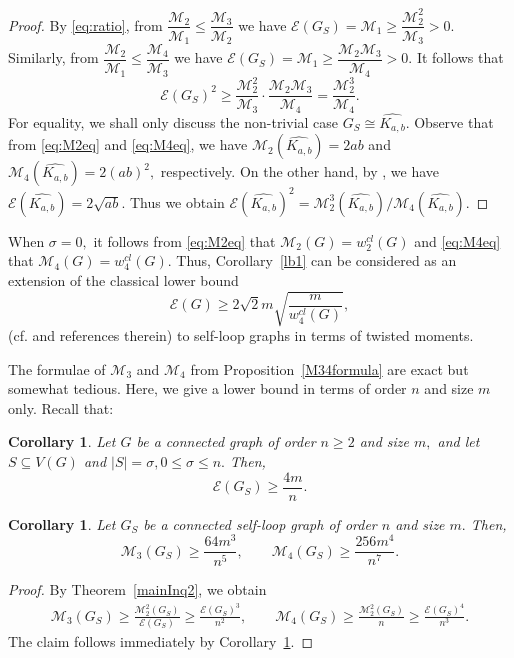 \documentclass[12pt,a4paper,reqno]{amsart}
\numberwithin{equation}{section}
\theoremstyle{plain}
\newtheorem{corollary}[theorem]{Corollary}
\theoremstyle{definition}
\newcommand{\<}{\langle}
\renewcommand{\>}{\rangle}
\newcommand{\cE}{{\mathcal E}}
\newcommand{\cM}{{\mathcal M}}
\begin{document}
\begin{proof}
By \eqref{eq:ratio}, from $\dfrac{\cM_2}{\cM_1} \leq \dfrac{\cM_3}{\cM_2}$ we have 
$
\cE(G_S)=\cM_1 \geq \dfrac{\cM_2^2}{\cM_3} > 0.
$
Similarly, from $\dfrac{\cM_2}{\cM_1} \leq \dfrac{\cM_4}{\cM_3}$ we have 
$
\cE(G_S)=\cM_1 \geq \dfrac{\cM_2\cM_3}{\cM_4} > 0.
$ 
It follows that 
\[
\cE(G_S)^2 \geq \dfrac{\cM_2^2}{\cM_3} \cdot \dfrac{\cM_2\cM_3}{\cM_4} = \dfrac{\cM_2^3}{\cM_4}. %
\]
For equality, we shall only discuss the non-trivial case $G_S \cong \widehat{K_{a,b}}.$  Observe that from \eqref{eq:M2eq} and \eqref{eq:M4eq}, we have $\cM_2(\widehat{K_{a,b}})=2ab$ and $\cM_4(\widehat{K_{a,b}})= 2(ab)^2,$ respectively. On the other hand, by \cite[Theorem 2.4, Case 5]{akbari2023selfloop}, we have $\cE(\widehat{K_{a,b}})=2\sqrt{ab}.$ Thus we obtain $\cE(\widehat{K_{a,b}})^2= \cM^3_2(\widehat{K_{a,b}})/\cM_4(\widehat{K_{a,b}}).$ 
\end{proof}

When $\sigma=0,$ it follows from \eqref{eq:M2eq} that $\cM_2(G)=w^{cl}_2(G)$ and \eqref{eq:M4eq} that $\cM_4(G)= w^{cl}_4(G).$ Thus, Corollary~\ref{lb1} can be considered as an extension of the classical lower bound 
\[
\cE(G) \geq 2\sqrt{2}m\sqrt{\frac{m}{w^{cl}_4(G)}},
\] (cf. \cite[\S 4, eq (11)]{MajKloGut2009} and references therein) to self-loop graphs in terms of twisted moments.

The formulae of $\cM_3$ and $\cM_4$ from Proposition~\ref{M34formula} are exact but somewhat tedious. Here, we give a lower bound in terms of order $n$ and size $m$ only. Recall that:

\begin{corollary}\cite[Corollary 3.6]{akbari2024line} \label{Cor3.8}
  Let $G$ be a connected graph of order $n \geq 2$ and size $m,$ and let $S \subseteq V(G)$ and $|S|=\sigma, 0 \leq \sigma \leq n.$ Then,
  \[
    \cE(G_S) \geq \frac{4m}{n}.
  \]
\end{corollary}

\begin{corollary}
\label{lb2}
Let $G_S$ be a connected self-loop graph of order $n$ and size $m.$ Then,
\begin{equation}
\label{eq:lb2}
\cM_3(G_S) \geq \frac{64m^3}{n^5}, \qquad
\cM_4(G_S) \geq \frac{256m^4}{n^7}.
\end{equation}
\end{corollary}

\begin{proof}
By Theorem~\ref{mainInq2}, we obtain 
\begin{align*}
\cM_3(G_S) \geq \frac{\cM_2^2(G_S)}{\cE(G_S)} \geq \frac{\cE(G_S)^3}{n^2}, \qquad 
\cM_4(G_S) \geq \frac{\cM_2^2(G_S)}{n} \geq \frac{\cE(G_S)^4}{n^3}.
\end{align*}
The claim follows immediately by Corollary~\ref{Cor3.8}. %
\end{proof}
\end{document}
